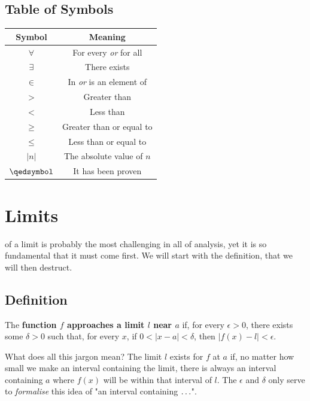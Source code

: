 \documentclass[10pt]{book}
\newcommand{\newthought}[1]{\vspace{0.5\baselineskip}\noindent{\scshape #1}}
\begin{document}
\section{Table of Symbols}
\begin{center}
  \begin{tabular}{cc}
    \toprule
    Symbol        & Meaning                       \\
    \midrule
    $\forall$     & For every \emph{or} for all   \\
    $\exists$     & There exists                  \\
    $ \in $       & In \emph{or} is an element of \\
    $ > $         & Greater than                  \\
    $ < $         & Less than                     \\
    $ \ge $       & Greater than or equal to      \\
    $ \le $       & Less than or equal to         \\
    $|n|$         & The absolute value of $n$     \\
    $\qedsymbol $ & It has been proven            \\
    \bottomrule
  \end{tabular}
\end{center}
\mainmatter
\chapter{Limits}
\newthought{The concept} of a limit is probably the most challenging in all of analysis, yet it is so fundamental that
it must come first. We will start with the definition, that we will then destruct.

\section{Definition}
\begin{tcolorbox}
  The \textbf{function $f$ approaches a limit $l$ near $a$} if, for every $\epsilon > 0$, there exists some
  $\delta > 0$ such that, for every $x$, if $0 < |x-a| < \delta$, then $|f(x)-l| < \epsilon$.
\end{tcolorbox}
What does all this jargon mean? The limit $l$ exists for $f$ at $a$ if, no matter how small we make an interval
containing the limit, there is always an interval containing $a$ where $f(x)$ will be within that interval of $l$.
The $\epsilon$ and $\delta$ only serve to \emph{formalise} this idea of "an interval containing $\mathellipsis$".
\end{document}
